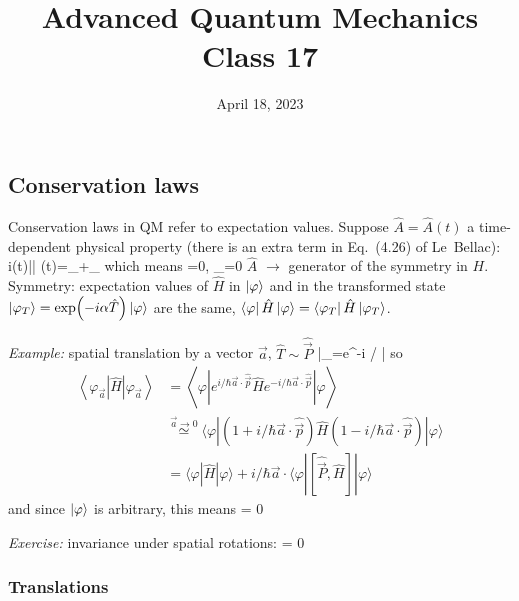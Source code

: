 \documentclass[12pt]{article}
\title{Advanced Quantum Mechanics\\Class 17}
\date{April 18, 2023}                                           %
\begin{document}
\maketitle

\subsection{Conservation laws}

Conservation laws in QM refer to expectation values.
Suppose $\hat{A} = \hat{A}(t)$ a time-dependent physical property
(there is an extra term in Eq.~(4.26) of Le~Bellac):
\be
i\hbar {}\langle\varphi(t)|| \varphi(t)\rangle=\rangle_{\varphi}+\left\langle{}\right\rangle_{\varphi}
\ee
which means
\be
{}=0, \langle{}\rangle_{\varphi}=0 
\ee
$\hat{A}$ $\rightarrow$ generator of the symmetry in $H$.
Symmetry: expectation values of $\hat H$ in $\ket{\varphi}$ and in
the transformed state $\ket{\varphi_T} = \exp(-i\alpha\hat{T})\ket{\varphi}$ are the same, $\bra{\varphi}\hat{H}\ket{\varphi} = \bra{\varphi_T}\hat{H}\ket{\varphi_T}$.

\emph{Example:} spatial translation by a vector $\vec{a}$, $\hat{T} \sim \hat{\vec{P}}$
\be
|\varphi\rangle_{}=e^{-i / \hbar {} \cdot {}}|\varphi\rangle
\ee
so
\[
\begin{aligned}
\left\langle\varphi_{\vec{a}}|\hat{H}| \varphi_{\vec{a}}\right\rangle 
&=\left\langle\varphi\left|e^{i / \hbar \vec{a} \cdot \hat{\vec{p}}} \hat{H} e^{-i / \hbar \vec{a} \cdot \hat{\vec{p}}}\right| \varphi\right\rangle \\ 
& \stackrel{\vec{a} \rightarrow 0}{\simeq}
\langle\varphi|
(1+i / \hbar \vec{a} \cdot \hat{\vec{p}}) \hat{H}
(1-i / \hbar \vec{a} \cdot \hat{\vec{p}})|\varphi\rangle\\
&=\langle\varphi|\hat{H}| \varphi\rangle+i / \hbar \vec{a} \cdot\langle\varphi|[\hat{\vec{P}}, \hat{H}]| \varphi\rangle
\end{aligned}
\]
and since $\ket{\varphi}$ is arbitrary, this means
 = 0
\ee

\emph{Exercise:} invariance under spatial rotations:
 = 0
\ee

\subsubsection{Translations}
 
\end{document}
